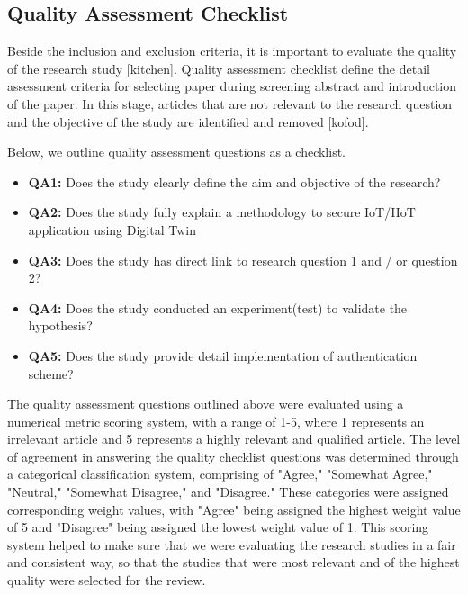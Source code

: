 % 
\subsection{Quality Assessment Checklist}
Beside the inclusion and exclusion criteria, it is important to evaluate the quality of the research study [kitchen]. Quality assessment checklist define the detail assessment criteria for selecting paper during screening abstract and introduction of the paper. In this stage, articles that are not relevant to the research question and the objective of the study are identified and removed [kofod]. 

Below, we outline quality assessment questions as a checklist. 
\begin{itemize}
    \item \textbf{QA1:} Does the study clearly define the aim and objective of the research?
    \item \textbf{QA2:} Does the study fully explain a methodology to secure IoT/IIoT application using Digital Twin
    \item \textbf{QA3:} Does the study has direct link to research question 1 and / or question 2?
    \item \textbf{QA4:} Does the study conducted an experiment(test) to validate the hypothesis? 
    \item \textbf{QA5:} Does the study provide detail implementation of authentication scheme?
    
\end{itemize}
The quality assessment questions outlined above were evaluated using a numerical metric scoring system, with a range of 1-5, where 1 represents an irrelevant article and 5 represents a highly relevant and qualified article. The level of agreement in answering the quality checklist questions was determined through a categorical classification system, comprising of "Agree," "Somewhat Agree," "Neutral," "Somewhat Disagree," and "Disagree." These categories were assigned corresponding weight values, with "Agree" being assigned the highest weight value of 5 and "Disagree" being assigned the lowest weight value of 1. This scoring system helped to make sure that we were evaluating the research studies in a fair and consistent way, so that the studies that were most relevant and of the highest quality were selected for the review.
